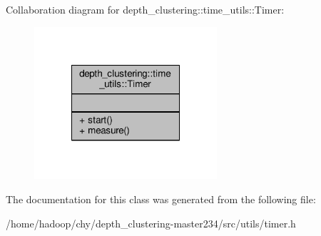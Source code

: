 Collaboration diagram for depth\-\_\-clustering\-:\-:time\-\_\-utils\-:\-:Timer\-:
\nopagebreak
\begin{figure}[H]
\begin{center}
\leavevmode
\includegraphics[width=192pt]{classdepth__clustering_1_1time__utils_1_1Timer__coll__graph}
\end{center}
\end{figure}


The documentation for this class was generated from the following file\-:\begin{DoxyCompactItemize}
\item 
/home/hadoop/chy/depth\-\_\-clustering-\/master234/src/utils/timer.\-h\end{DoxyCompactItemize}
